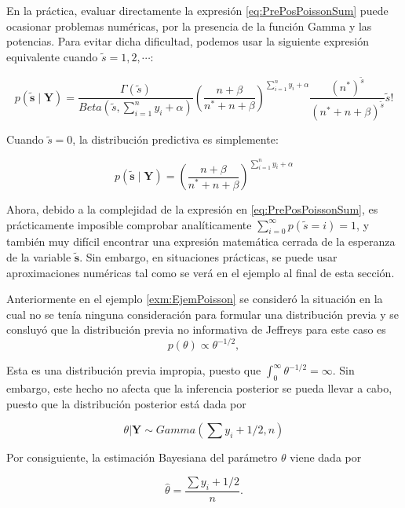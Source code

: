 \documentclass[
  12pt,
  spanish,
]{book}
\theoremstyle{definition}
\theoremstyle{definition}
\theoremstyle{definition}
\theoremstyle{definition}
\theoremstyle{remark}
\begin{document}
En la práctica, evaluar directamente la expresión \eqref{eq:PrePosPoissonSum} puede ocasionar problemas numéricas, por la presencia de la función Gamma y las potencias. Para evitar dicha dificultad, podemos usar la siguiente expresión equivalente cuando \(\tilde{s}=1,2,\cdots\):

\begin{equation*}
p(\tilde{\mathbf{s}} \mid \mathbf{Y})=\frac{\Gamma(\tilde{s})}{Beta(\tilde{s},\sum_{i=1}^ny_i+\alpha)}
\left(\frac{n+\beta}{n^*+n+\beta}\right)^{\sum_{i=1}^ny_i+\alpha}\frac{(n^*)^{\tilde{s}}}{(n^*+n+\beta)^{\tilde{s}}}\tilde{s}!
\end{equation*}

Cuando \(\tilde{s}=0\), la distribución predictiva es simplemente:

\begin{equation*}
p(\tilde{\mathbf{s}} \mid \mathbf{Y})=
\left(\frac{n+\beta}{n^*+n+\beta}\right)^{\sum_{i=1}^ny_i+\alpha}
\end{equation*}

Ahora, debido a la complejidad de la expresión en \eqref{eq:PrePosPoissonSum}, es prácticamente imposible comprobar analíticamente \(\sum_{i=0}^\infty p(\tilde{s}=i)=1\), y también muy difícil encontrar una expresión matemática cerrada de la esperanza de la variable \(\mathbf{\tilde{s}}\). Sin embargo, en situaciones prácticas, se puede usar aproximaciones numéricas tal como se verá en el ejemplo al final de esta sección.

Anteriormente en el ejemplo \ref{exm:EjemPoisson} se consideró la situación en la cual no se tenía ninguna consideración para formular una distribución previa y se consluyó que la distribución previa no informativa de Jeffreys para este caso es
\begin{equation*}
p(\theta)\propto\theta^{-1/2},
\end{equation*}

Esta es una distribución previa impropia, puesto que \(\int_{0}^\infty \theta^{-1/2}=\infty\). Sin embargo, este hecho no afecta que la inferencia posterior se pueda llevar a cabo, puesto que la distribución posterior está dada por

\begin{equation*}
\theta|\mathbf{Y}\sim Gamma(\sum y_i+1/2,n)
\end{equation*}

Por consiguiente, la estimación Bayesiana del parámetro \(\theta\) viene dada por

\begin{equation*}
\hat{\theta}=\frac{\sum y_i+1/2}{n}.
\end{equation*}
\end{document}
